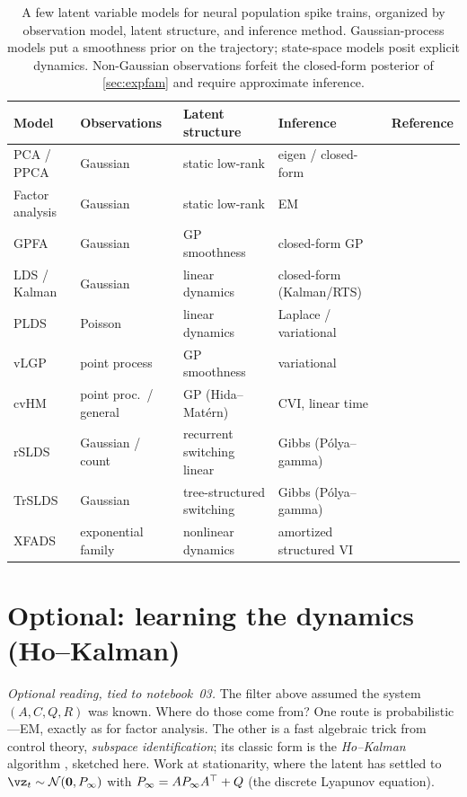 \documentclass[11pt]{article}
\theoremstyle{plain}
\theoremstyle{definition}
\theoremstyle{remark}
\theoremstyle{definition}
\newcommand{\Normal}{\mathcal{N}}
\begin{document}
\begin{table}[t]
  \centering
  \footnotesize
  \begin{tabular}{@{}lllll@{}}
    \toprule
    Model & Observations & Latent structure & Inference & Reference \\
    \midrule
    PCA / PPCA & Gaussian & static low-rank & eigen / closed-form & \parencite{Tipping1999-cv} \\
    Factor analysis & Gaussian & static low-rank & EM & \parencite{Bishop2006-to} \\
    GPFA & Gaussian & GP smoothness & closed-form GP & \parencite{Yu2009-qp} \\
    LDS / Kalman & Gaussian & linear dynamics & closed-form (Kalman/RTS) & \parencite{Kalman1960-wt,Rauch1965-rts} \\
    PLDS & Poisson & linear dynamics & Laplace / variational & \parencite{Macke2011-ep} \\
    vLGP & point process & GP smoothness & variational & \parencite{Zhao2016a} \\
    cvHM & point proc.\ / general & GP (Hida--Mat\'ern) & CVI, linear time & \parencite{Dowling2023c} \\
    rSLDS & Gaussian / count & recurrent switching linear & Gibbs (P\'olya--gamma) & \parencite{Linderman2017-tb} \\
    TrSLDS & Gaussian & tree-structured switching & Gibbs (P\'olya--gamma) & \parencite{Nassar2018b} \\
    XFADS & exponential family & nonlinear dynamics & amortized structured VI & \parencite{Dowling2024-xfads} \\
    \bottomrule
  \end{tabular}
  \caption{A few latent variable models for neural population spike trains,
    organized by observation model, latent structure, and inference method.
    Gaussian-process models put a smoothness prior on the trajectory;
    state-space models posit explicit dynamics. Non-Gaussian observations
    forfeit the closed-form posterior of \cref{sec:expfam} and require
    approximate inference.}
  \label{tab:neurallvm}
\end{table}

\section{Optional: learning the dynamics (Ho--Kalman)}\label{sec:hokalman}

\emph{Optional reading, tied to notebook~03.} The filter above assumed the system
$(A, C, Q, R)$ was known. Where do those come from? One route is
probabilistic---EM, exactly as for factor analysis. The other is a fast algebraic
trick from control theory, \emph{subspace identification}; its classic form is the
\emph{Ho--Kalman} algorithm \parencite{Katayama2005-jt}, sketched here. Work at
stationarity, where the latent has settled to $\vz_t \sim \Normal(\mathbf 0,
P_\infty)$ with $P_\infty = A P_\infty A{^\top} + Q$ (the discrete Lyapunov
equation).
\end{document}
